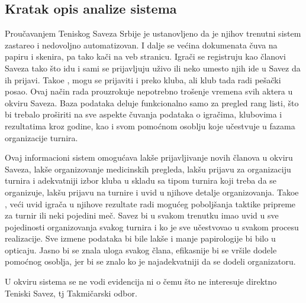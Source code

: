 \documentclass{article}
\begin{document}
\subsection{Kratak opis analize sistema}
Proučavanjem Teniskog Saveza Srbije je ustanovljeno da je njihov trenutni sistem zastareo i nedovoljno automatizovan. I dalje se većina dokumenata čuva na papiru i skenira, pa tako kači na veb stranicu. Igrači se registruju kao članovi Saveza tako što idu i sami se prijavljuju uživo ili neko umesto njih ide u Savez da ih prijavi. Tako\dj e , mogu se prijaviti i preko kluba, ali klub tada radi pešački posao. Ovaj način rada prouzrokuje nepotrebno trošenje vremena svih aktera u okviru Saveza. Baza podataka deluje funkcionalno samo za pregled rang listi, što bi trebalo proširiti na sve aspekte čuvanja podataka o igračima, klubovima i rezultatima kroz godine, kao i svom pomoćnom osoblju koje učestvuje u fazama organizacije turnira.\par
Ovaj informacioni sistem omogućava lakše prijavljivanje novih članova u okviru Saveza, lakše organizovanje medicinskih pregleda, lakšu prijavu za organizaciju turnira i adekvatniji izbor kluba u skladu sa tipom turnira koji treba da se organizuje, lakšu prijavu na turnire i uvid u njihove detalje organizovanja. Tako\dj e , veći uvid igrača u njihove rezultate radi mogućeg poboljšanja taktike pripreme za turnir ili neki pojedini meč. Savez bi u svakom trenutku imao uvid u sve pojedinosti organizovanja svakog turnira i ko je sve učestvovao u svakom procesu realizacije. Sve izmene podataka bi bile lakše i manje papirologije bi bilo u opticaju. Jasno bi se znala uloga svakog člana, efikasnije bi se vršile dodele pomoćnog osoblja, jer bi se znalo ko je najadekvatniji da se dodeli organizatoru. \par
U okviru sistema se ne vodi evidencija ni o čemu što ne interesuje direktno Teniski Savez, tj Takmičarski odbor. 
\end{document}
